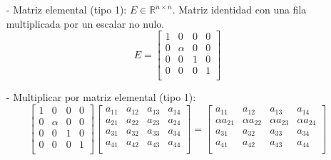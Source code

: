 \begin{itemize}
    \item[-] Matriz elemental (tipo 1): $E \in \mathbb{R}^{n \times n}$. Matriz identidad con una fila multiplicada por un escalar no nulo.
    \[
    E = 
    \begin{bmatrix}
    1 & 0 & 0 & 0 \\
    0 & \alpha & 0 & 0 \\
    0 & 0 & 1 & 0 \\
    0 & 0 & 0 & 1 \\
    \end{bmatrix}
    \]
    
    \item[-] Multiplicar por matriz elemental (tipo 1):
    \[
    \begin{bmatrix}
    1 & 0 & 0 & 0 \\
    0 & \alpha & 0 & 0 \\
    0 & 0 & 1 & 0 \\
    0 & 0 & 0 & 1 \\
    \end{bmatrix}
    \begin{bmatrix}
    a_{11} & a_{12} & a_{13} & a_{14} \\
    a_{21} & a_{22} & a_{23} & a_{24} \\
    a_{31} & a_{32} & a_{33} & a_{34} \\
    a_{41} & a_{42} & a_{43} & a_{44} \\
    \end{bmatrix}
    =
    \begin{bmatrix}
    a_{11} & a_{12} & a_{13} & a_{14} \\
    \alpha a_{21} & \alpha a_{22} & \alpha a_{23} & \alpha a_{24} \\
    a_{31} & a_{32} & a_{33} & a_{34} \\
    a_{41} & a_{42} & a_{43} & a_{44} \\
    \end{bmatrix}
    \]
    

\end{itemize}
